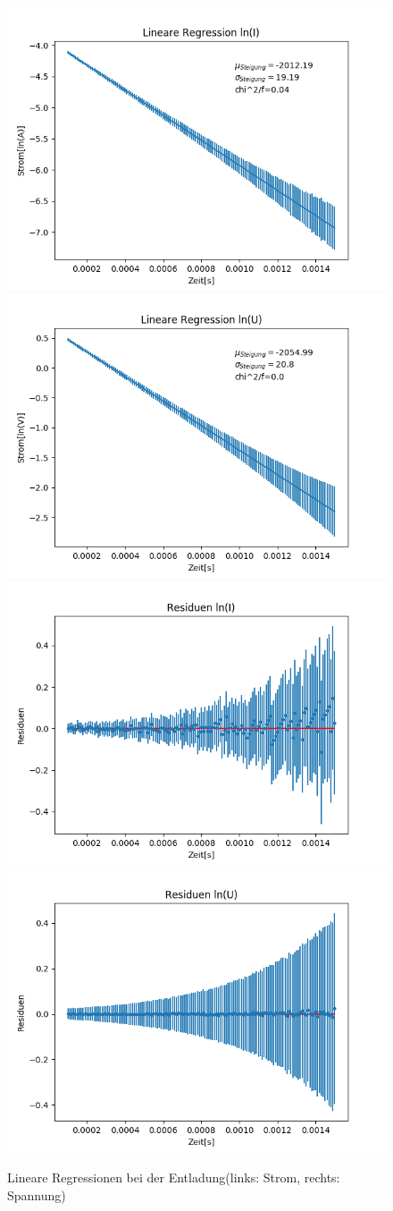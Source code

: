 \documentclass[12pt,a4paper]{article}
\begin{document}
\begin{figure}
\begin{center}
\includegraphics[width=0.49\linewidth]{Bilder/Kondensator_ent_linI}
\includegraphics[width=0.49\linewidth]{Bilder/Kondensator_ent_linU}
\includegraphics[width=0.49\linewidth]{Bilder/Kondensator_ent_resI}
\includegraphics[width=0.49\linewidth]{Bilder/Kondensator_ent_resU}
\caption[Rohdaten logarith. A]{Lineare Regressionen bei der Entladung(links: Strom, rechts: Spannung)}
\label{fig:linEnt}
\end{center}
\end{figure}
\end{document}
